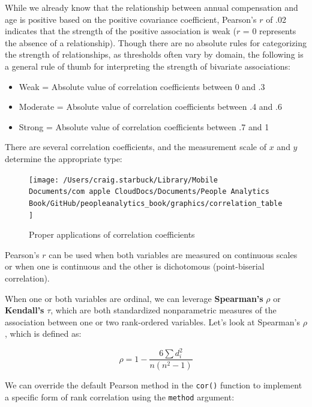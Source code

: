 \documentclass[
]{book}
\newenvironment{Shaded}{\begin{snugshade}}{\end{snugshade}}
\newcommand{\AttributeTok}[1]{\textcolor[rgb]{0.77,0.63,0.00}{#1}}
\newcommand{\CommentTok}[1]{\textcolor[rgb]{0.56,0.35,0.01}{\textit{#1}}}
\newcommand{\FunctionTok}[1]{\textcolor[rgb]{0.00,0.00,0.00}{#1}}
\newcommand{\NormalTok}[1]{#1}
\newcommand{\SpecialCharTok}[1]{\textcolor[rgb]{0.00,0.00,0.00}{#1}}
\newcommand{\StringTok}[1]{\textcolor[rgb]{0.31,0.60,0.02}{#1}}
\providecommand{\tightlist}{%
  \setlength{\itemsep}{0pt}\setlength{\parskip}{0pt}}
\begin{document}
While we already know that the relationship between annual compensation and age is positive based on the positive covariance coefficient, Pearson's \(r\) of .02 indicates that the strength of the positive association is weak (\(r\) = 0 represents the absence of a relationship). Though there are no absolute rules for categorizing the strength of relationships, as thresholds often vary by domain, the following is a general rule of thumb for interpreting the strength of bivariate associations:

\begin{itemize}
\tightlist
\item
  Weak = Absolute value of correlation coefficients between 0 and .3
\item
  Moderate = Absolute value of correlation coefficients between .4 and .6
\item
  Strong = Absolute value of correlation coefficients between .7 and 1
\end{itemize}

There are several correlation coefficients, and the measurement scale of \(x\) and \(y\) determine the appropriate type:

\begin{figure}

{\centering \texttt{[image: /Users/craig.starbuck/Library/Mobile Documents/com~apple~CloudDocs/Documents/People Analytics Book/GitHub/peopleanalytics\_book/graphics/correlation\_table]} 

}

\caption{Proper applications of correlation coefficients}\label{fig:corr-table}
\end{figure}

Pearson's \(r\) can be used when both variables are measured on continuous scales or when one is continuous and the other is dichotomous (point-biserial correlation).

When one or both variables are ordinal, we can leverage \textbf{Spearman's} \(\rho\) or \textbf{Kendall's} \(\tau\), which are both standardized nonparametric measures of the association between one or two rank-ordered variables. Let's look at Spearman's \(\rho\), which is defined as:

\[ \rho = 1 - {\frac {6 \sum d_i^2}{n(n^2 - 1)}} \]

We can override the default Pearson method in the \texttt{cor()} function to implement a specific form of rank correlation using the \texttt{method} argument:

\begin{Shaded}
\end{Shaded}
\end{document}
